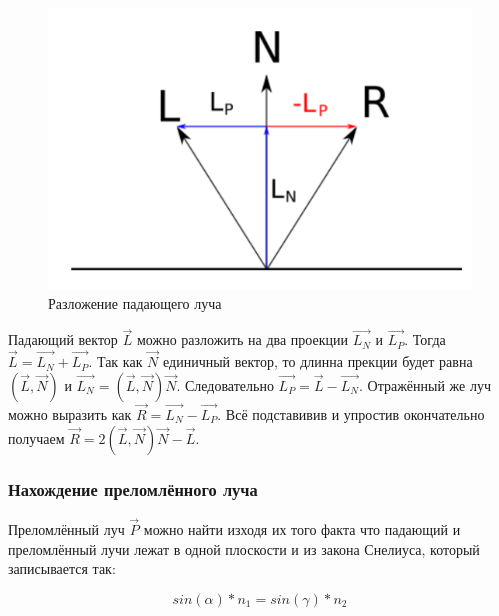 \begin{figure}[htp]
	\centering
	\includegraphics[scale=0.5]{img/reflect.png}
	\caption{Разложение падающего луча}
	\label{fig:reflect}
\end{figure}

Падающий вектор $\vec{L}$ можно разложить на два проекции $\vec{L_{N}}$ и $\vec{L_{P}}$. Тогда $\vec{L} = \vec{L_{N}} + \vec{L_{P}}$. Так как $\vec{N}$ единичный вектор, то длинна прекции будет равна $(\vec{L}, \vec{N})$ и $\vec{L_{N}} = (\vec{L}, \vec{N})\vec{N}$. Следовательно $\vec{L_{P}} = \vec{L} - \vec{L_{N}}$. Отражённый же луч можно выразить как $\vec{R} = \vec{L_{N}} - \vec{L_{P}}$. Всё подставивив и упростив окончательно получаем $\vec{R} = 2(\vec{L}, \vec{N})\vec{N} - \vec{L}$.

\subsubsection{Нахождение преломлённого луча}

Преломлённый луч $\vec{P}$ можно найти изходя их того факта что падающий и преломлённый лучи лежат в одной плоскости и из закона Снелиуса, который записывается так:

\[
sin(\alpha)*n_{1} = sin(\gamma)*n_{2}
\label{eq:9}
\] 

